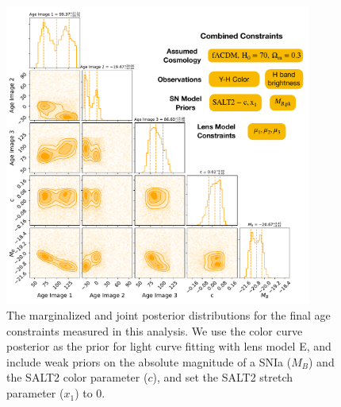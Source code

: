 \documentclass[12pt]{article}
\begin{document}
{%
\begin{figure}
    \centering
    \includegraphics[width=0.9\textwidth]{Paper/Figures/lc_modelH_color_corner_labels.pdf}
    \caption{The marginalized and joint posterior distributions for the final age constraints measured in this analysis. We use the color curve posterior as the prior for light curve fitting with lens model E, and include weak priors on the absolute magnitude of a SNIa ($M_B$) and the SALT2 color parameter ($c$), and set the SALT2 stretch parameter ($x_1$) to 0.}
    \label{fig:corner_combined}
\end{figure}

}
\end{document}

